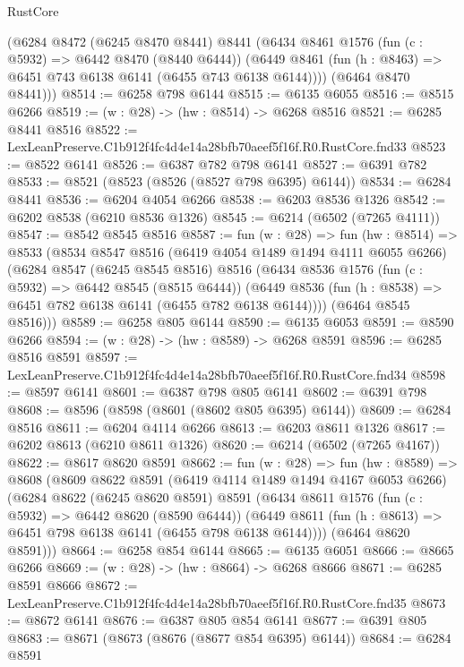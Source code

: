 \begin{lexlean}{RustCore}
\begin{coremodule}
      (@6284
        @8472
        (@6245 @8470 @8441)
        @8441
        (@6434
          @8461
          @1576
          (fun (c : @5932) => @6442 @8470 (@8440 @6444))
          (@6449 @8461 (fun (h : @8463) => @6451 @743 @6138 @6141 (@6455 @743 @6138 @6144))))
        (@6464 @8470 @8441)))
@8514 := @6258 @798 @6144
@8515 := @6135 @6055
@8516 := @8515 @6266
@8519 := (w : @28) -> (hw : @8514) -> @6268 @8516
@8521 := @6285 @8441 @8516
@8522 := LexLeanPreserve.C1b912f4fc4d4e14a28bfb70aeef5f16f.R0.RustCore.fnd33
@8523 := @8522 @6141
@8526 := @6387 @782 @798 @6141
@8527 := @6391 @782
@8533 := @8521 (@8523 (@8526 (@8527 @798 @6395) @6144))
@8534 := @6284 @8441
@8536 := @6204 @4054 @6266
@8538 := @6203 @8536 @1326
@8542 := @6202 @8538 (@6210 @8536 @1326)
@8545 := @6214 (@6502 (@7265 @4111))
@8547 := @8542 @8545 @8516
@8587 := fun (w : @28) =>
  fun (hw : @8514) =>
  @8533
    (@8534
      @8547
      @8516
      (@6419 @4054 @1489 @1494 @4111 @6055 @6266)
      (@6284
        @8547
        (@6245 @8545 @8516)
        @8516
        (@6434
          @8536
          @1576
          (fun (c : @5932) => @6442 @8545 (@8515 @6444))
          (@6449 @8536 (fun (h : @8538) => @6451 @782 @6138 @6141 (@6455 @782 @6138 @6144))))
        (@6464 @8545 @8516)))
@8589 := @6258 @805 @6144
@8590 := @6135 @6053
@8591 := @8590 @6266
@8594 := (w : @28) -> (hw : @8589) -> @6268 @8591
@8596 := @6285 @8516 @8591
@8597 := LexLeanPreserve.C1b912f4fc4d4e14a28bfb70aeef5f16f.R0.RustCore.fnd34
@8598 := @8597 @6141
@8601 := @6387 @798 @805 @6141
@8602 := @6391 @798
@8608 := @8596 (@8598 (@8601 (@8602 @805 @6395) @6144))
@8609 := @6284 @8516
@8611 := @6204 @4114 @6266
@8613 := @6203 @8611 @1326
@8617 := @6202 @8613 (@6210 @8611 @1326)
@8620 := @6214 (@6502 (@7265 @4167))
@8622 := @8617 @8620 @8591
@8662 := fun (w : @28) =>
  fun (hw : @8589) =>
  @8608
    (@8609
      @8622
      @8591
      (@6419 @4114 @1489 @1494 @4167 @6053 @6266)
      (@6284
        @8622
        (@6245 @8620 @8591)
        @8591
        (@6434
          @8611
          @1576
          (fun (c : @5932) => @6442 @8620 (@8590 @6444))
          (@6449 @8611 (fun (h : @8613) => @6451 @798 @6138 @6141 (@6455 @798 @6138 @6144))))
        (@6464 @8620 @8591)))
@8664 := @6258 @854 @6144
@8665 := @6135 @6051
@8666 := @8665 @6266
@8669 := (w : @28) -> (hw : @8664) -> @6268 @8666
@8671 := @6285 @8591 @8666
@8672 := LexLeanPreserve.C1b912f4fc4d4e14a28bfb70aeef5f16f.R0.RustCore.fnd35
@8673 := @8672 @6141
@8676 := @6387 @805 @854 @6141
@8677 := @6391 @805
@8683 := @8671 (@8673 (@8676 (@8677 @854 @6395) @6144))
@8684 := @6284 @8591

\end{coremodule}
\end{lexlean}
